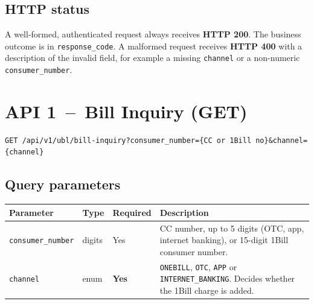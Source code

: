 \documentclass[11pt]{article}
\begin{document}
\subsection{HTTP status}
A well-formed, authenticated request always receives \textbf{HTTP 200}. The business outcome is in
\texttt{response\_code}. A malformed request receives \textbf{HTTP 400} with a description of the
invalid field, for example a missing \texttt{channel} or a non-numeric \texttt{consumer\_number}.

\section{API 1 \,--\, Bill Inquiry (GET)}

\begin{lstlisting}
GET /api/v1/ubl/bill-inquiry?consumer_number={CC or 1Bill no}&channel={channel}
\end{lstlisting}

\subsection{Query parameters}
\begin{center}
\begin{tabularx}{\textwidth}{@{}l l l L@{}}
\toprule
\textbf{Parameter} & \textbf{Type} & \textbf{Required} & \textbf{Description} \\
\midrule
\texttt{consumer\_number} & digits & Yes & CC number, up to 5 digits (OTC, app, internet banking), or 15-digit 1Bill consumer number. \\
\texttt{channel} & enum & \textbf{Yes} & \texttt{ONEBILL}, \texttt{OTC}, \texttt{APP} or \texttt{INTERNET\_BANKING}. Decides whether the 1Bill charge is added. \\
\bottomrule
\end{tabularx}
\end{center}
\end{document}
